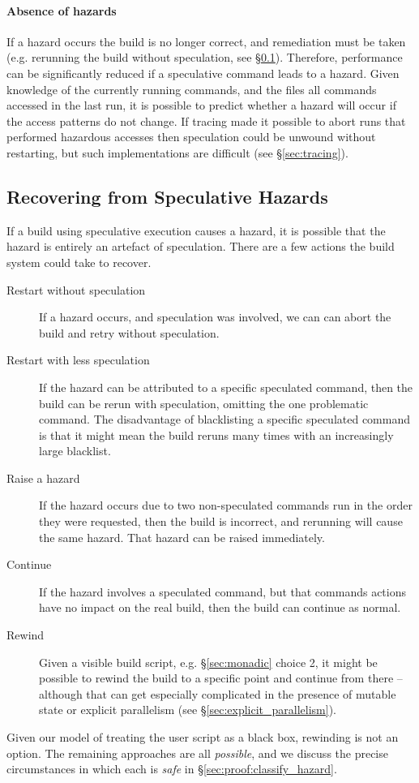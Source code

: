 \paragraph{Absence of hazards} If a hazard occurs the build is no longer correct, and remediation must be taken (e.g. rerunning the build without speculation, see \S\ref{sec:recovering}). Therefore, performance can be significantly reduced if a speculative command leads to a hazard. Given knowledge of the currently running commands, and the files all commands accessed in the last run, it is possible to predict whether a hazard will occur if the access patterns do not change. If tracing made it possible to abort runs that performed hazardous accesses then speculation could be unwound without restarting, but such implementations are difficult (see \S\ref{sec:tracing}).

\subsection{Recovering from Speculative Hazards}
\label{sec:recovering}

If a build using speculative execution causes a hazard, it is possible that the hazard is entirely an artefact of speculation. There are a few actions the build system could take to recover.

\begin{description}
\item[Restart without speculation] If a hazard occurs, and speculation was involved, we can can abort the build and retry without speculation.
\item[Restart with less speculation] If the hazard can be attributed to a specific speculated command, then the build can be rerun with speculation, omitting the one problematic command. The disadvantage of blacklisting a specific speculated command is that it might mean the build reruns many times with an increasingly large blacklist.
\item[Raise a hazard] If the hazard occurs due to two non-speculated commands run in the order they were requested, then the build is incorrect, and rerunning will cause the same hazard. That hazard can be raised immediately.
\item[Continue] If the hazard involves a speculated command, but that commands actions have no impact on the real build, then the build can continue as normal.
\item[Rewind] Given a visible build script, e.g. \S\ref{sec:monadic} choice 2, it might be possible to rewind the build to a specific point and continue from there -- although that can get especially complicated in the presence of mutable state or explicit parallelism (see \S\ref{sec:explicit_parallelism}).
\end{description}

Given our model of treating the user script as a black box, rewinding is not an option. The remaining approaches are all \emph{possible}, and we discuss the precise circumstances in which each is \emph{safe} in \S\ref{sec:proof:classify_hazard}.
